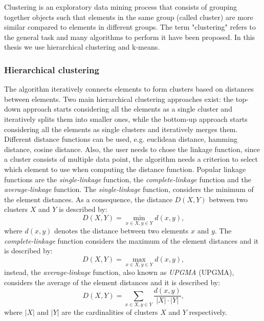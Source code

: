 Clustering is an exploratory data mining process that consists of grouping together objects such that elements in the same group (called cluster) are more similar compared to elements in different groups. The term "clustering" refers to the general task and many algorithms to perform it have been proposed. In this thesis we use hierarchical clustering and k-means.

\subsubsection*{Hierarchical clustering}

The algorithm iteratively connects elements to form clusters based on distances between elements. Two main hierarchical clustering approaches exist: the top-down approach starts considering all the elements as a single cluster and iteratively splits them into smaller ones, while the bottom-up approach starts considering all the elements as single clusters and iteratively merges them. Different distance functions can be used, e.g. euclidean distance, hamming distance, cosine distance. Also, the user needs to chose the linkage function, since a cluster consists of multiple data point, the algorithm needs a criterion to select which element to use when computing the distance function. Popular linkage functions are the \textit{single-linkage} function, the \textit{complete-linkage} function and the \textit{average-linkage} function. The \textit{single-linkage} function, considers the minimum of the element distances. As a consequence, the distance $D(X,Y)$ between two clusters $X$ and $Y$ is described by: 
\begin{equation}
 D(X,Y)= \min_{x\in X,y\in Y} d(x,y)  \text{,}
\end{equation}
 \label{eq:single_linkage}
 where $d(x,y)$ denotes the distance between two elements $x$ and $y$. The
\textit{complete-linkage} function considers the maximum of the element distances and it is described by:
\begin{equation}
 D(X,Y)=\max_{x\in X,y\in Y} d(x,y)  \text{,}
\end{equation}
 \label{eq:complete_linkage}
 instead, the \textit{average-linkage} function, also known as \textit{\acl{UPGMA}} (\acs{UPGMA}), considers the average of the element distances and it is described by:
 \begin{equation}
 D(X,Y)=\sum_{x\in X,y\in Y} \frac{d(x,y)}{|X|\cdot|Y|}  \text{,}
\end{equation}
 \label{eq:average_linkage}
 where $|X|$ and $|Y|$ are the cardinalities of clusters $X$ and $Y$ respectively.
